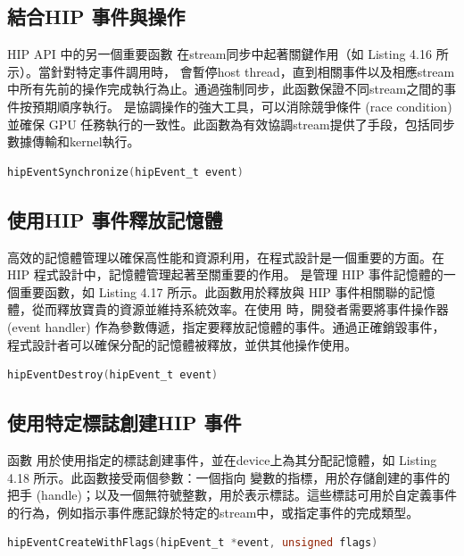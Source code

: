 \subsection{結合HIP 事件與操作}
HIP API 中的另一個重要函數  在stream同步中起著關鍵作用（如 Listing 4.16 所示）。當針對特定事件調用時， 會暫停host thread，直到相關事件以及相應stream中所有先前的操作完成執行為止。通過強制同步，此函數保證不同stream之間的事件按預期順序執行。 是協調操作的強大工具，可以消除競爭條件 (race condition) 並確保 GPU 任務執行的一致性。此函數為有效協調stream提供了手段，包括同步數據傳輸和kernel執行。

\begin{lstlisting}[language=C, caption={使用 hipEventSynchronize()
合併操作}, label={16th:example}]
hipEventSynchronize(hipEvent_t event)
\end{lstlisting}

\subsection{使用HIP 事件釋放記憶體}
高效的記憶體管理以確保高性能和資源利用，在程式設計是一個重要的方面。在 HIP 程式設計中，記憶體管理起著至關重要的作用。 是管理 HIP 事件記憶體的一個重要函數，如 Listing 4.17 所示。此函數用於釋放與 HIP 事件相關聯的記憶體，從而釋放寶貴的資源並維持系統效率。在使用  時，開發者需要將事件操作器 (event handler) 作為參數傳遞，指定要釋放記憶體的事件。通過正確銷毀事件，程式設計者可以確保分配的記憶體被釋放，並供其他操作使用。

\begin{lstlisting}[language=C, caption={使用 hipEventDestroy()
釋放記憶體}, label={17th:example}]
hipEventDestroy(hipEvent_t event)
\end{lstlisting}

\subsection{使用特定標誌創建HIP 事件}
函數  用於使用指定的標誌創建事件，並在device上為其分配記憶體，如 Listing 4.18 所示。此函數接受兩個參數：一個指向  變數的指標，用於存儲創建的事件的把手 (handle)；以及一個無符號整數，用於表示標誌。這些標誌可用於自定義事件的行為，例如指示事件應記錄於特定的stream中，或指定事件的完成類型。

\begin{lstlisting}[language=C, caption={使用 hipEventCreateWithFlags()
創建帶有標誌的事件}, label={18th:example}]
hipEventCreateWithFlags(hipEvent_t *event, unsigned flags)
\end{lstlisting}

